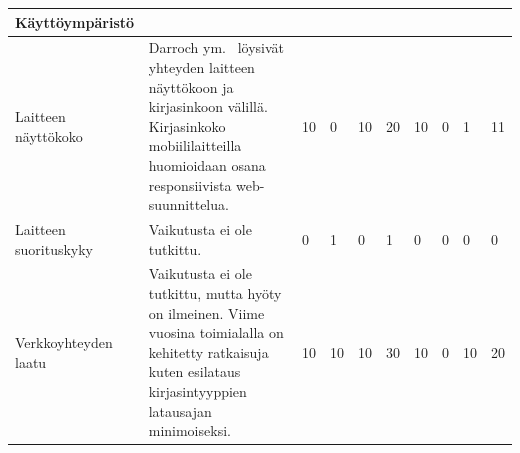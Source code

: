 \documentclass[finnish, 12pt, a4paper, elec, utf8, a-1b, online]{aaltothesis}
\begin{document}
{\begin{longtable}{p{2.5cm}|p{6cm}|p{0.5cm}p{0.5cm}p{0.5cm}|p{0.5cm}|p{0.5cm}p{0.5cm}p{0.5cm}|p{0.5cm}|}
    \midrule
    \textbf{Käyttöympäristö}                                                                                                                                                                                                                                                                                                                                                                                                                                                                                                                                                                                                                   \\
    \midrule
    Laitteen näyttökoko                    & Darroch ym.~\cite{10.1007/11555261_23} löysivät yhteyden laitteen näyttökoon ja kirjasinkoon välillä. Kirjasinkoko mobiililaitteilla huomioidaan osana responsiivista web-suunnittelua.                                                                       & 10                                         & 0                                   & 10                                     & 20                           & 10                                              & 0                                         & 1                                         & 11                           \\
    \midrule
    Laitteen suorituskyky                  & Vaikutusta ei ole tutkittu.                                                                                                                                                                                                                                   & 0                                          & 1                                   & 0                                      & 1                            & 0                                               & 0                                         & 0                                         & 0                            \\
    \midrule
    Verkkoyhteyden laatu                   & Vaikutusta ei ole tutkittu, mutta hyöty on ilmeinen. Viime vuosina toimialalla on kehitetty ratkaisuja kuten esilataus~\cite{grigorik_2020} kirjasintyyppien latausajan minimoiseksi.                                                                         & 10                                         & 10                                  & 10                                     & 30                           & 10                                              & 0                                         & 10                                        & 20                           \\

\end{longtable}}
\end{document}
